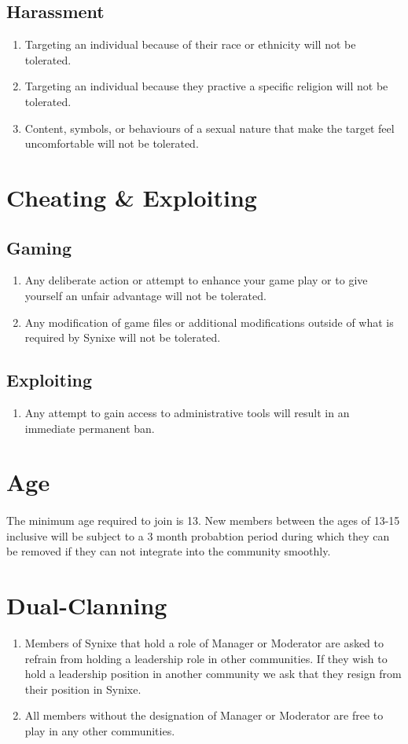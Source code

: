 \documentclass[10pt,a4paper]{article}
\begin{document}
\subsection{Harassment}
\begin{enumerate}
	\item Targeting an individual because of their race or ethnicity will not be tolerated.
	\item Targeting an individual because they practive a specific religion will not be tolerated.
	\item Content, symbols, or behaviours of a sexual nature that make the target feel uncomfortable will not be tolerated.
\end{enumerate}
\section{Cheating \& Exploiting}
\subsection{Gaming}
\begin{enumerate}
	\item Any deliberate action or attempt to enhance your game play or to give yourself an unfair advantage will not be tolerated.
	\item Any modification of game files or additional modifications outside of what is required by Synixe will not be tolerated.
\end{enumerate}
\subsection{Exploiting}
\begin{enumerate}
	\item Any attempt to gain access to administrative tools will result in an immediate permanent ban.
\end{enumerate}
\section{Age}
\paragraph{}
The minimum age required to join is 13. New members between the ages of 13-15 inclusive will be subject to a 3 month probabtion period during which they can be removed if they can not integrate into the community smoothly.
\section{Dual-Clanning}
\begin{enumerate}
	\item Members of Synixe that hold a role of Manager or Moderator are asked to refrain from holding a leadership role in other communities. If they wish to hold a leadership position in another community we ask that they resign from their position in Synixe.
	\item All members without the designation of Manager or Moderator are free to play in any other communities.
\end{enumerate}
\end{document}
